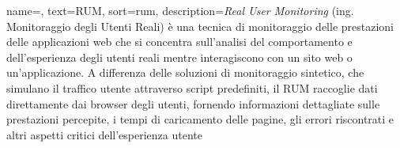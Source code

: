  {
    name=,
    text=RUM,
    sort=rum,
    description={\emph{Real User Monitoring} (ing. Monitoraggio degli Utenti Reali) è una tecnica di monitoraggio delle prestazioni delle applicazioni web che si concentra sull'analisi del comportamento e dell'esperienza degli utenti reali mentre interagiscono con un sito web o un'applicazione. A differenza delle soluzioni di monitoraggio sintetico, che simulano il traffico utente attraverso script predefiniti, il RUM raccoglie dati direttamente dai browser degli utenti, fornendo informazioni dettagliate sulle prestazioni percepite, i tempi di caricamento delle pagine, gli errori riscontrati e altri aspetti critici dell'esperienza utente}
}